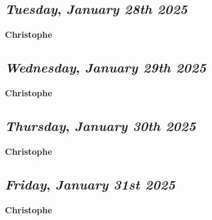 \def\day{\textit{January 28th 2025}}
\def\weekday{\textit{Tuesday}}
\subsection*{\weekday, \day}
\textbf {Christophe}

\def\day{\textit{January 29th 2025}}
\def\weekday{\textit{Wednesday}}
\subsection*{\weekday, \day}
\textbf {Christophe}

\def\day{\textit{January 30th 2025}}
\def\weekday{\textit{Thursday}}
\subsection*{\weekday, \day}
\textbf {Christophe}

\def\day{\textit{January 31st 2025}}
\def\weekday{\textit{Friday}}
\subsection*{\weekday, \day}
\textbf {Christophe}
